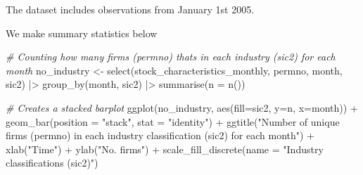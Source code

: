 \documentclass[
]{article}
\newenvironment{Shaded}{\begin{snugshade}}{\end{snugshade}}
\newcommand{\AttributeTok}[1]{\textcolor[rgb]{0.77,0.63,0.00}{#1}}
\newcommand{\CommentTok}[1]{\textcolor[rgb]{0.56,0.35,0.01}{\textit{#1}}}
\newcommand{\FunctionTok}[1]{\textcolor[rgb]{0.00,0.00,0.00}{#1}}
\newcommand{\NormalTok}[1]{#1}
\newcommand{\OtherTok}[1]{\textcolor[rgb]{0.56,0.35,0.01}{#1}}
\newcommand{\SpecialCharTok}[1]{\textcolor[rgb]{0.00,0.00,0.00}{#1}}
\newcommand{\StringTok}[1]{\textcolor[rgb]{0.31,0.60,0.02}{#1}}
\begin{document}
\begin{Shaded}
\end{Shaded}

The dataset includes observations from January 1st 2005.

We make summary statistics below

\begin{Shaded}
\begin{Highlighting}[]
\CommentTok{\# Counting how many firms (permno) thats in each industry (sic2) for each month}
\NormalTok{no\_industry }\OtherTok{\textless{}{-}} \FunctionTok{select}\NormalTok{(stock\_characteristics\_monthly, permno, month, sic2) }\SpecialCharTok{|\textgreater{}}
                \FunctionTok{group\_by}\NormalTok{(month, sic2) }\SpecialCharTok{|\textgreater{}}
                \FunctionTok{summarise}\NormalTok{(}\AttributeTok{n =} \FunctionTok{n}\NormalTok{())}

\CommentTok{\# Creates a stacked barplot}
\FunctionTok{ggplot}\NormalTok{(no\_industry, }\FunctionTok{aes}\NormalTok{(}\AttributeTok{fill=}\NormalTok{sic2, }\AttributeTok{y=}\NormalTok{n, }\AttributeTok{x=}\NormalTok{month)) }\SpecialCharTok{+}
  \FunctionTok{geom\_bar}\NormalTok{(}\AttributeTok{position =} \StringTok{"stack"}\NormalTok{, }\AttributeTok{stat =} \StringTok{"identity"}\NormalTok{) }\SpecialCharTok{+}
  \FunctionTok{ggtitle}\NormalTok{(}\StringTok{"Number of unique firms (permno) in each industry classification (sic2) for each month"}\NormalTok{) }\SpecialCharTok{+} 
  \FunctionTok{xlab}\NormalTok{(}\StringTok{"Time"}\NormalTok{) }\SpecialCharTok{+} 
  \FunctionTok{ylab}\NormalTok{(}\StringTok{"No. firms"}\NormalTok{) }\SpecialCharTok{+}
  \FunctionTok{scale\_fill\_discrete}\NormalTok{(}\AttributeTok{name =} \StringTok{"Industry classifications (sic2)"}\NormalTok{)}
\end{Highlighting}
\end{Shaded}
\end{document}
